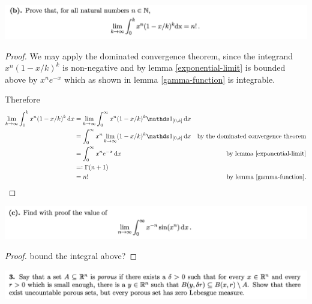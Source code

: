 \begin{mdframed}
\includegraphics[width=400pt]{img/analysis--berkeley-202a-final-96cc.png}
\end{mdframed}

\begin{proof}

  We may apply the dominated convergence theorem, since the integrand $x^n (1 - x/k)^k$ is
  non-negative and by lemma \ref{exponential-limit} is bounded above by $x^ne^{-x}$ which as shown
  in lemma \ref{gamma-function} is integrable.

  Therefore
  \begin{align*}
    \lim_{k \to \infty} \int_0^k x^n (1 - x/k)^k \dx
    &= \lim_{k \to \infty} \int_0^\infty x^n (1 - x/k)^k\ind_{[0, k]} \dx \\
    &= \int_0^\infty x^n \lim_{k \to \infty} (1 - x/k)^k\ind_{[0, k]} \dx & \text{by the dominated convergence theorem}\\
    &= \int_0^\infty x^n e^{-x} \dx & \text{by lemma \ref{exponential-limit}}\\
    &=: \Gamma(n + 1) \\
    &= n!  & \text{by lemma \ref{gamma-function}}.\\
  \end{align*}
\end{proof}


\begin{mdframed}
\includegraphics[width=400pt]{img/analysis--berkeley-202a-final-c137.png}
\end{mdframed}

\begin{proof}
  bound the integral above?
\end{proof}


\newpage
\begin{mdframed}
\includegraphics[width=400pt]{img/analysis--berkeley-202a-final-ef68.png}
\end{mdframed}

